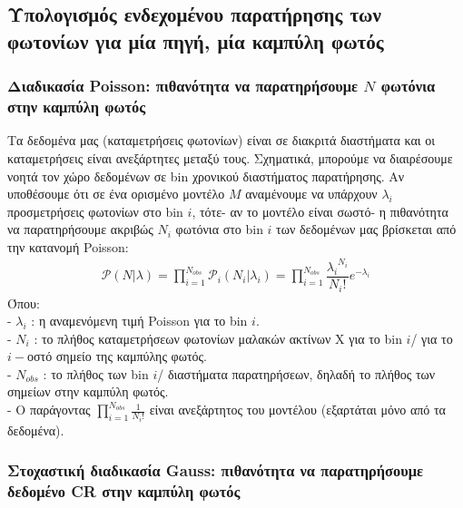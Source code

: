 \subsection{Υπολογισμός ενδεχομένου παρατήρησης των φωτονίων για μία πηγή, μία καμπύλη φωτός}

\subsubsection*{Διαδικασία \textlatin{Poisson}: πιθανότητα να παρατηρήσουμε $Ν$ φωτόνια στην καμπύλη φωτός}

Τα δεδομένα μας (καταμετρήσεις φωτονίων) είναι σε διακριτά διαστήματα και οι καταμετρήσεις είναι ανεξάρτητες μεταξύ τους. Σχηματικά, μπορούμε να διαιρέσουμε νοητά τον χώρο δεδομένων σε \textlatin{bin} χρονικού διαστήματος παρατήρησης. Αν υποθέσουμε ότι σε ένα ορισμένο μοντέλο $M$ αναμένουμε να υπάρχουν $\lambda_i$ προσμετρήσεις φωτονίων στο \textlatin{bin} $i$, τότε- αν το μοντέλο είναι σωστό- η πιθανότητα να παρατηρήσουμε ακριβώς $N_i$ φωτόνια στο \textlatin{bin} $i$ των δεδομένων μας βρίσκεται από την κατανομή \textlatin{Poisson}: 
\begin{equation}\begin{aligned} \mathcal{P}(N|\lambda) =  \prod_{i=1}^{N_{obs}} \mathcal{P}_i(N_i|\lambda_i)   = \prod_{i=1}^{N_{obs}} \dfrac{{\lambda_i}^{N_i}}{N_i !} e^{-\lambda_i}   \label{eq:Poisson_i}\end{aligned}\end{equation}
Όπου:\\
- $ \lambda_i$ : η αναμενόμενη τιμή \textlatin{Poisson} για το \textlatin{bin} $i$. \\ 
- $N_i$ : το πλήθος καταμετρήσεων φωτονίων μαλακών ακτίνων Χ για το \textlatin{bin} $i$/ για το $i-$οστό σημείο της καμπύλης φωτός.\\
- $N_{obs}$ : το πλήθος των \textlatin{bin} $i$/ διαστήματα παρατηρήσεων, δηλαδή το πλήθος των σημείων στην καμπύλη φωτός.\\ 
- Ο παράγοντας $\prod_{i=1}^{N_{obs}} \frac{1}{ N_i !}$ είναι ανεξάρτητος του μοντέλου (εξαρτάται μόνο από τα δεδομένα).  

\subsubsection*{Στοχαστική διαδικασία \textlatin{Gauss}: πιθανότητα να παρατηρήσουμε δεδομένο  \textlatin{CR} στην καμπύλη φωτός}


